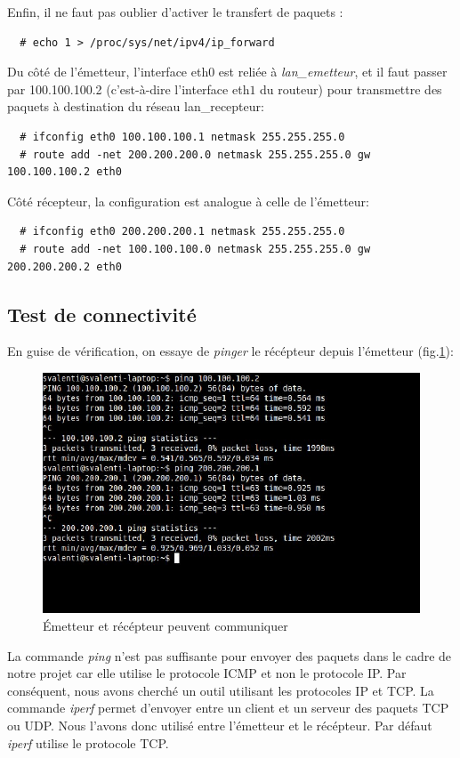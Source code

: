 \documentclass[a4paper]{article}
\begin{document}
Enfin, il ne faut pas oublier d'activer le transfert de
paquets :
\begin{verbatim}
  # echo 1 > /proc/sys/net/ipv4/ip_forward
\end{verbatim}

Du côté de l'émetteur, l'interface eth$0$ est reliée à
\textit{lan\_emetteur}, et il faut passer par 100.100.100.2
(c'est-à-dire l'interface eth$1$ du routeur) pour transmettre
des paquets à destination du réseau lan\_recepteur:
\begin{verbatim}
  # ifconfig eth0 100.100.100.1 netmask 255.255.255.0
  # route add -net 200.200.200.0 netmask 255.255.255.0 gw 100.100.100.2 eth0
\end{verbatim}

Côté récepteur, la configuration est analogue à celle de l'émetteur:
\begin{verbatim}
  # ifconfig eth0 200.200.200.1 netmask 255.255.255.0
  # route add -net 100.100.100.0 netmask 255.255.255.0 gw 200.200.200.2 eth0
\end{verbatim}

\subsection{Test de connectivité}
En guise de vérification, on essaye de \textit{pinger} le
récépteur depuis l'émetteur (fig.\ref{ping1}):

\begin{figure}
	\centering
	\includegraphics[scale=.5]{ping.jpg}
	\caption{\label{ping1} Émetteur et récépteur peuvent communiquer}
\end{figure}

La commande \textit{ping} n'est pas suffisante pour envoyer
des paquets dans le cadre de notre projet car elle utilise
le protocole ICMP et non le protocole IP. Par conséquent,
nous avons cherché un outil utilisant les protocoles IP et TCP.
La commande \textit{iperf} permet d'envoyer entre un client et
un serveur des paquets TCP ou UDP. Nous l'avons donc utilisé
entre l'émetteur et le récépteur. Par défaut \textit{iperf}
utilise le protocole TCP.
\end{document}
